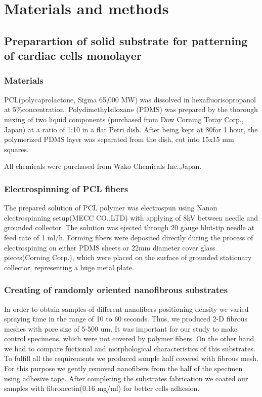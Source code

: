 \section{Materials and methods}
\label{sec:methods}

\subsection{Preparartion of solid substrate for patterning of cardiac cells monolayer}
\subsubsection{Materials}
	\label{sec:specimen_preparation_electrospinning}


PCL(polycaprolactone, Sigma 65,000 MW) was dissolved in hexafluorisopropanol at 5\%concentration.  
Polydimethylsiloxane (PDMS) was prepared by the thorough mixing of two liquid components (purchased from Dow Corning Toray Corp., Japan) at a ratio of 1:10 in a flat Petri dish. After being kept at 80\gc\space for 1 hour, the polymerized PDMS layer was separated from the dish, cut into 15x15 mm squares.

All chemicals were purchased from Wako Chemicals Inc.,Japan.
\subsubsection{Electrospinning of PCL fibers}
The prepared solution of PCL polymer was electrospun using Nanon electrospinning setup(MECC CO.,LTD) with applying of 8kV between needle and grounded collector. The solution was ejected through 20 gauge blut-tip needle at feed rate of 1 ml/h. Forming fibers were deposited directly during the process of electrospining on either PDMS sheets or 22mm diameter cover glass pieces(Corning Corp.), which were placed on the surface of grounded stationary collector, representing a huge metal plate.    
\subsubsection{Creating of randomly oriented nanofibrous substrates}
In order to obtain samples of different nanofibers positioning density we varied spraying time in the range of 10 to 60 seconds. Thus, we produced 2-D fibrous meshes with pore size of 5-500 um. 
It was important for our study to make control specimens, which were not covered by polymer fibers. On  the other hand we had to compare fuctional and morphological characteristics of this substrates. To fulfill all the requirements we produced sample half covered with fibrous mesh. For this purpose we gently removed nanofibers from the half of the specimen using adhesive tape. After completing the substrates fabrication we coated our samples with fibronectin(0.16 mg/ml) for better cells adhesion.
